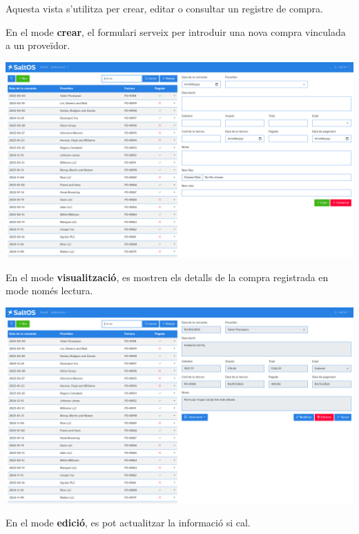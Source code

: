 \documentclass[a4paper]{article}
\begin{document}
Aquesta vista s'utilitza per crear, editar o consultar un registre de compra.

En el mode \textbf{crear}, el formulari serveix per introduir una nova compra vinculada a un proveïdor.

\begin{center}\includegraphics[width=1\textwidth]{../ujest/snaps/test-screenshots-js-screenshots-purchases-purchase-create-ca-es-1-snap.png}\end{center}

En el mode \textbf{visualització}, es mostren els detalls de la compra registrada en mode només lectura.

\begin{center}\includegraphics[width=1\textwidth]{../ujest/snaps/test-screenshots-js-screenshots-purchases-purchase-view-100-ca-es-1-snap.png}\end{center}

En el mode \textbf{edició}, es pot actualitzar la informació si cal.
\end{document}
